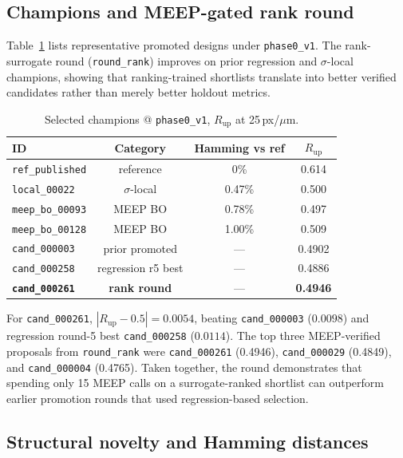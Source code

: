 \documentclass[11pt,a4paper]{article}
\begin{document}
\subsection{Champions and MEEP-gated rank round}

Table~\ref{tab:champions} lists representative promoted designs under \texttt{phase0\_v1}.
The rank-surrogate round (\texttt{round\_rank}) improves on prior regression and $\sigma$-local champions, showing that ranking-trained shortlists translate into better verified candidates rather than merely better holdout metrics.

\begin{table}[t]
  \centering
  \caption{Selected champions @ \texttt{phase0\_v1}, $R_{\mathrm{up}}$ at 25\,px/$\mu$m.}
  \label{tab:champions}
  \begin{tabular}{lccc}
    \toprule
    ID & Category & Hamming vs ref & $R_{\mathrm{up}}$ \\
    \midrule
    \texttt{ref\_published} & reference & 0\% & 0.614 \\
    \texttt{local\_00022} & $\sigma$-local & 0.47\% & 0.500 \\
    \texttt{meep\_bo\_00093} & MEEP BO & 0.78\% & 0.497 \\
    \texttt{meep\_bo\_00128} & MEEP BO & 1.00\% & 0.509 \\
    \texttt{cand\_000003} & prior promoted & --- & 0.4902 \\
    \texttt{cand\_000258} & regression r5 best & --- & 0.4886 \\
    \textbf{\texttt{cand\_000261}} & \textbf{rank round} & --- & \textbf{0.4946} \\
    \bottomrule
  \end{tabular}
\end{table}

For \texttt{cand\_000261}, $|R_{\mathrm{up}} - 0.5| = 0.0054$, beating \texttt{cand\_000003} ($0.0098$) and regression round-5 best \texttt{cand\_000258} ($0.0114$).
The top three MEEP-verified proposals from \texttt{round\_rank} were \texttt{cand\_000261} (0.4946), \texttt{cand\_000029} (0.4849), and \texttt{cand\_000004} (0.4765).
Taken together, the round demonstrates that spending only 15 MEEP calls on a surrogate-ranked shortlist can outperform earlier promotion rounds that used regression-based selection.

\subsection{Structural novelty and Hamming distances}
\end{document}

